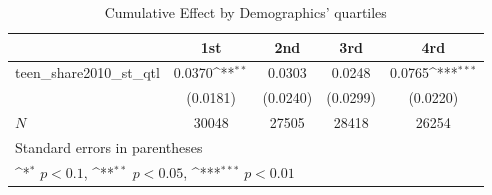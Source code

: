 \begin{table}[htbp]\centering
\def\sym#1{\ifmmode^{#1}\else\(^{#1}\)\fi}
\caption{Cumulative Effect by Demographics' quartiles}
\begin{tabular}{l*{4}{c}}
\hline\hline
            &\multicolumn{1}{c}{1st}&\multicolumn{1}{c}{2nd}&\multicolumn{1}{c}{3rd}&\multicolumn{1}{c}{4rd}\\
\hline
teen\_share2010\_st\_qtl&      0.0370\sym{**} &      0.0303         &      0.0248         &      0.0765\sym{***}\\
            &    (0.0181)         &    (0.0240)         &    (0.0299)         &    (0.0220)         \\
\hline
\(N\)       &       30048         &       27505         &       28418         &       26254         \\
\hline\hline
\multicolumn{5}{l}{\footnotesize Standard errors in parentheses}\\
\multicolumn{5}{l}{\footnotesize \sym{*} \(p<0.1\), \sym{**} \(p<0.05\), \sym{***} \(p<0.01\)}\\
\end{tabular}
\end{table}
